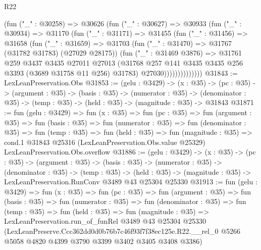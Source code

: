 \begin{lexlean}{R22}
\begin{coremodule}
                  (fun ("_" : @30258) =>
                  @30626
                    (fun ("_" : @30627) =>
                    @30933
                      (fun ("_" : @30934) =>
                      @31170
                        (fun ("_" : @31171) =>
                        @31455
                          (fun ("_" : @31456) =>
                          @31658
                            (fun ("_" : @31659) =>
                            @31703
                              (fun ("_" : @31470) => @31767 (@31782 @31783) (@27029 @28175))
                              (fun ("_" : @31469 @3876) =>
                              @31761
                                @259
                                @3437
                                @3435
                                @27011
                                @27013
                                (@31768
                                  @257
                                  @141
                                  @3435
                                  @3435
                                  @256
                                  @3393
                                  (@3689 @31758 @11 @256)
                                  @31783)
                                @27030))))))))))))))
@31843 := LexLeanPreservation.Obs
@31853 := (gelu : @3429) ->
  (x : @35) ->
  (pc : @35) ->
  (argument : @35) ->
  (basis : @35) ->
  (numerator : @35) ->
  (denominator : @35) -> (temp : @35) -> (held : @35) -> (magnitude : @35) -> @31843
@31871 := fun (gelu : @3429) =>
  fun (x : @35) =>
  fun (pc : @35) =>
  fun (argument : @35) =>
  fun (basis : @35) =>
  fun (numerator : @35) =>
  fun (denominator : @35) =>
  fun (temp : @35) =>
  fun (held : @35) =>
  fun (magnitude : @35) =>
  cond.{1} @31843 @25316 (LexLeanPreservation.Obs.value @25329) LexLeanPreservation.Obs.overflow
@31886 := (gelu : @3429) ->
  (x : @35) ->
  (pc : @35) ->
  (argument : @35) ->
  (basis : @35) ->
  (numerator : @35) ->
  (denominator : @35) ->
  (temp : @35) ->
  (held : @35) -> (magnitude : @35) -> LexLeanPreservation.RunConv @3489 @43 @25304 @25330
@31913 := fun (gelu : @3429) =>
  fun (x : @35) =>
  fun (pc : @35) =>
  fun (argument : @35) =>
  fun (basis : @35) =>
  fun (numerator : @35) =>
  fun (denominator : @35) =>
  fun (temp : @35) =>
  fun (held : @35) =>
  fun (magnitude : @35) =>
  LexLeanPreservation.run_of_funRel
    @3489
    @43
    @25304
    @25330
    (LexLeanPreserve.Ccc362dd0d0b76b7c46f93f7f38ec125e.R22.__rel_0
      @5266
      @5058
      @4820
      @4399
      @3790
      @3399
      @3402
      @3405
      @3408
      @3386)
\end{coremodule}
\end{lexlean}
